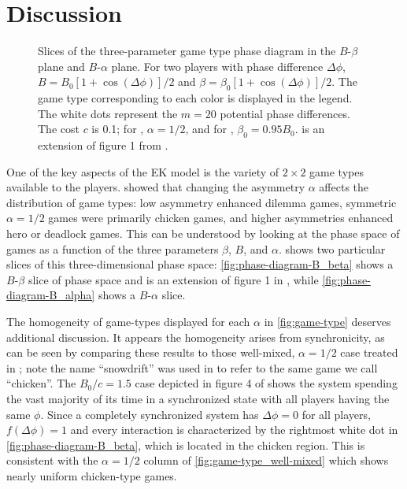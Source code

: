 \documentclass[pdflatex,lineno,referee,sn-mathphys-ay]{sn-jnl}
\begin{document}
\section{Discussion}
\label{sec:discussion}

\begin{figure}
  \centering
  
  \caption{
    Slices of the three-parameter game type phase diagram
    in the
    $B$-$\beta$ plane
    and
    $B$-$\alpha$ plane.
    For two players with phase difference $\Delta \phi$,
    $B = B_0 [1 + \cos(\Delta \phi)]/2$
    and
    $\beta = \beta_0 [1 + \cos(\Delta \phi)]/2$.
    The game type corresponding to each color is displayed in the legend.
    The white dots represent the $m=20$ potential phase differences.
    The cost $c$ is \num{0.1};
    for
    ,
    $\alpha = 1/2$,
    and for
    ,
    $\beta_0 = \num{0.95} B_0$.
    is an extension of figure 1 from \citet{tripp2022evolutionary}.
  }
  \label{fig:phase-diagram}
\end{figure}

One of the key aspects of the EK model
is the variety of $2 \times 2$ game types available to the players.
 showed that changing the asymmetry $\alpha$
affects the distribution of game types:
low asymmetry enhanced dilemma games,
symmetric $\alpha = 1/2$ games were primarily chicken games,
and higher asymmetries enhanced hero or deadlock games.
This can be understood by looking at the phase space of games
as a function of the three parameters $\beta$, $B$, and $\alpha$.
 shows two particular slices
of this three-dimensional phase space:
\cref{fig:phase-diagram-B_beta} shows a $B$-$\beta$ slice of phase space
and is an extension of figure 1 in \citet{tripp2022evolutionary},
while \cref{fig:phase-diagram-B_alpha} shows a $B$-$\alpha$ slice.

The homogeneity of game-types displayed for each $\alpha$ in \cref{fig:game-type}
deserves additional discussion.
It appears the homogeneity arises from synchronicity,
as can be seen by comparing these results
to those well-mixed, $\alpha = 1/2$ case treated in \citet{tripp2022evolutionary};
note the name ``snowdrift'' was used in \citet{tripp2022evolutionary}
to refer to the same game we \citep[and][]{bruns2015names} call ``chicken''.
The $B_0/c = 1.5$ case depicted in figure 4 of \citet{tripp2022evolutionary}
shows the system spending the vast majority of its time in a synchronized state
with all players having the same $\phi$.
Since a completely synchronized system has $\Delta \phi = 0$ for all players,
$f(\Delta \phi) = 1$ and every interaction is characterized
by the rightmost white dot in \cref{fig:phase-diagram-B_beta},
which is located in the chicken region.
This is consistent with the $\alpha = 1/2$ column
of \cref{fig:game-type_well-mixed} which shows nearly uniform chicken-type games.
\end{document}
